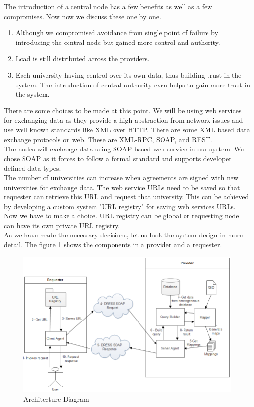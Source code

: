 \documentclass[12pt,a4paper,oneside]{book}
\begin{document}
The introduction of a central node has a few benefits as well as a few compromises. Now now we discuss these one by one.

\begin{enumerate}
\item Although we compromised avoidance from single point of failure by introducing the central node but gained more control and authority. 
\item Load is still distributed across the providers.
\item Each university having control over its own data, thus building trust in the system. The introduction of central authority even helps to gain more trust in the system.
\end{enumerate}

There are some choices to be made at this point. We will be using web services for exchanging data as they provide a high abstraction from network issues and use well known standards like XML over HTTP. There are some XML based data exchange protocols on web. These are XML-RPC, SOAP, and REST. \\

The nodes will exchange data using SOAP based web service in our system.  We chose SOAP as it forces to follow a formal standard and supports developer defined data types. \\

The number of universities can increase when agreements are signed with new universities for exchange data. The web service URLs need to be saved so that requester can retrieve this URL and request that university. This can be achieved by developing a custom system "URL registry" for saving web services URLs. Now we have to make a choice. URL registry can be global or requesting node can have its own private URL registry. \\

As we have made the necessary decisions, let us look the system design in more detail. The figure \ref{fig:architecture} shows the components in a provider and a requester. \\

\begin{figure}[!htp]
  \centering
  \includegraphics[width=14cm]{architecture.png}
  \caption{Architecture Diagram}
  \label{fig:architecture}
\end{figure}
\end{document}
